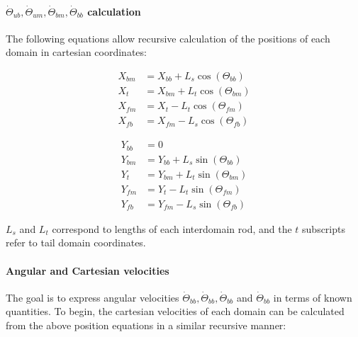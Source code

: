 \documentclass[10pt]{article} %
\begin{document}
\paragraph{$\dot{\Theta}_{ub}, \dot{\Theta}_{um}, \dot{\Theta}_{bm}, \dot{\Theta}_{bb}$ calculation}

The following equations allow recursive calculation of the positions of each domain in cartesian coordinates:

\noindent\begin{minipage}{0.49\linewidth}
\begin{align}
  X_{bm} &= X_{bb}+L_{s}\cos(\Theta_{bb}) \\
  X_{t}  &= X_{bm}+L_{t}\cos(\Theta_{bm}) \\
  X_{fm} &= X_{t} - L_{t}\cos(\Theta_{fm}) \\
  X_{fb} &= X_{fm} - L_{s}\cos(\Theta_{fb})
\end{align}
\end{minipage}
\begin{minipage}{0.49\linewidth}
\begin{align}
  Y_{bb} &= 0 \\
  Y_{bm} &= Y_{bb}+L_{s}\sin(\Theta_{bb}) \\
  Y_{t}  &= Y_{bm}+L_{t}\sin(\Theta_{bm}) \\
  Y_{fm} &= Y_{t} - L_{t}\sin(\Theta_{fm}) \\
  Y_{fb} &= Y_{fm} - L_{s}\sin(\Theta_{fb})
\end{align}
\end{minipage}
\vspace{.5cm}

$L_s$ and $L_t$ correspond to lengths of each interdomain rod, and the $t$ subscripts refer to tail domain coordinates.\\

\paragraph{Angular and Cartesian velocities}
The goal is to express angular velocities $\dot{\Theta}_{bb}, \dot{\Theta}_{bb}, \dot{\Theta}_{bb}$ and $\dot{\Theta}_{bb}$ in terms of known quantities. To begin, the cartesian velocities of each domain can be calculated from the above position equations in a similar recursive manner:
\end{document}
